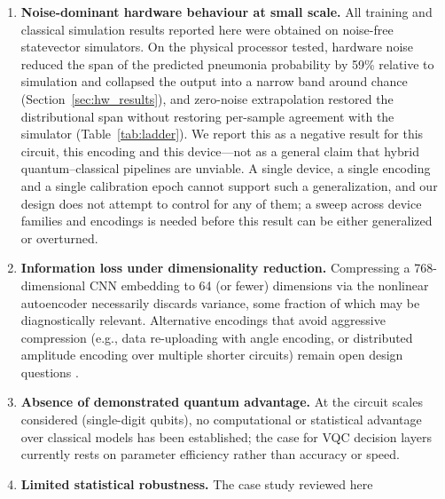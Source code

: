 \documentclass[11pt,a4paper]{article}
\begin{document}
\begin{enumerate}[leftmargin=1.4em]
    Figure~\ref{fig:confusion} show over-flagging of normal studies, which is
    the error direction one would expect under a reduced positive prior.
    We note, however, that we do not isolate the shift's effect: without a
    prevalence-matched control split we cannot attribute any part of the
    reported performance to the shift rather than to the other differences
    enumerated in Section~\ref{sec:hybrid}, and the domain-adversarial stage
    included in the pipeline was not ablated against a no-adaptation control,
    so its contribution is likewise qualitative.
  \item \textbf{Noise-dominant hardware behaviour at small scale.}  All training
    and classical simulation results reported here were obtained on noise-free
    statevector simulators.  On the physical processor tested, hardware noise
    reduced the span of the predicted pneumonia probability by 59\% relative
    to simulation and collapsed the output into a narrow band around chance
    (Section~\ref{sec:hw_results}), and zero-noise extrapolation restored the
    distributional span without restoring per-sample agreement with the
    simulator (Table~\ref{tab:ladder}).  We report this as a negative result
    for this circuit, this encoding and this device---not as a general claim
    that hybrid quantum--classical pipelines are unviable.  A single device, a
    single encoding and a single calibration epoch cannot support such a
    generalization, and our design does not attempt to control for any of
    them; a sweep across device families and encodings is needed before this
    result can be either generalized or overturned.
  \item \textbf{Information loss under dimensionality reduction.}  Compressing
    a 768-dimensional CNN embedding to 64 (or fewer) dimensions via the
    nonlinear autoencoder
    necessarily discards variance, some fraction of which may be diagnostically
    relevant.  Alternative encodings that avoid aggressive compression
    (e.g., data re-uploading \cite{perez2020} with angle encoding, or
    distributed amplitude encoding over multiple shorter circuits) remain open
    design questions \cite{sharma2023survey}.
  \item \textbf{Absence of demonstrated quantum advantage.}  At the circuit
    scales considered (single-digit qubits), no computational or statistical
    advantage over classical models has been established; the case for VQC
    decision layers currently rests on parameter efficiency rather than
    accuracy or speed.
  \item \textbf{Limited statistical robustness.}  The case study reviewed here

\end{enumerate}
\end{document}
